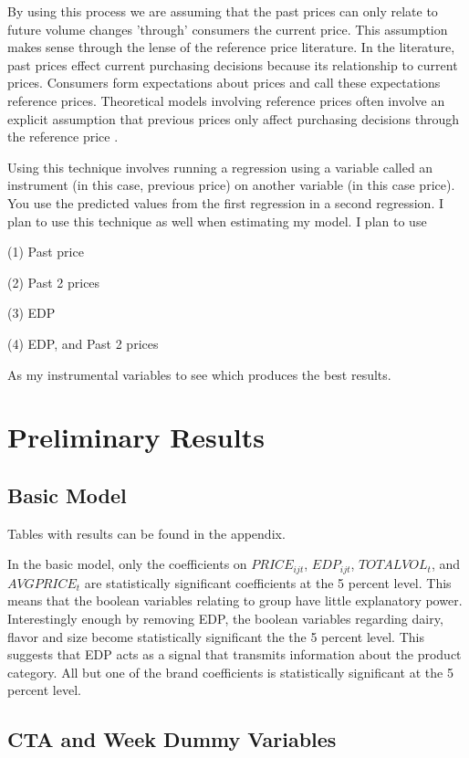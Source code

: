 \documentclass{article}
\begin{document}
By using this process we are assuming that the past prices can only relate to future volume changes 'through' consumers the current price. This assumption makes sense through the lense of the reference price literature. In the literature, past prices effect current purchasing decisions because its relationship to current prices. Consumers form expectations about prices and call these expectations reference prices. Theoretical models involving reference prices often involve an explicit assumption that previous prices only affect purchasing decisions through the reference price \cite{putler}.

Using this technique involves running a regression using a variable called an instrument (in this case, previous price) on another variable (in this case price). You use the predicted values from the first regression in a second regression.  I plan to use this technique as well when estimating my model. I plan to use 

(1) Past price

(2) Past 2 prices

(3) EDP

(4) EDP, and Past 2 prices

As my instrumental variables to see which produces the best results.

\section{Preliminary Results}

\subsection{Basic Model}

Tables with results can be found in the appendix.

In the basic model, only the coefficients on ${PRICE}_{ijt}$, ${EDP}_{ijt}$, ${TOTALVOL}_t $, and ${AVGPRICE}_{t}$ are statistically significant coefficients at the 5 percent level. This means that the boolean variables relating to group have little explanatory power. Interestingly enough by removing EDP, the boolean variables regarding dairy, flavor and size become statistically significant the the 5 percent level. This suggests that EDP acts as a signal that transmits information about the product category. All but one of the brand coefficients is statistically significant at the 5 percent level.


\subsection{CTA and Week Dummy Variables}
\end{document}
